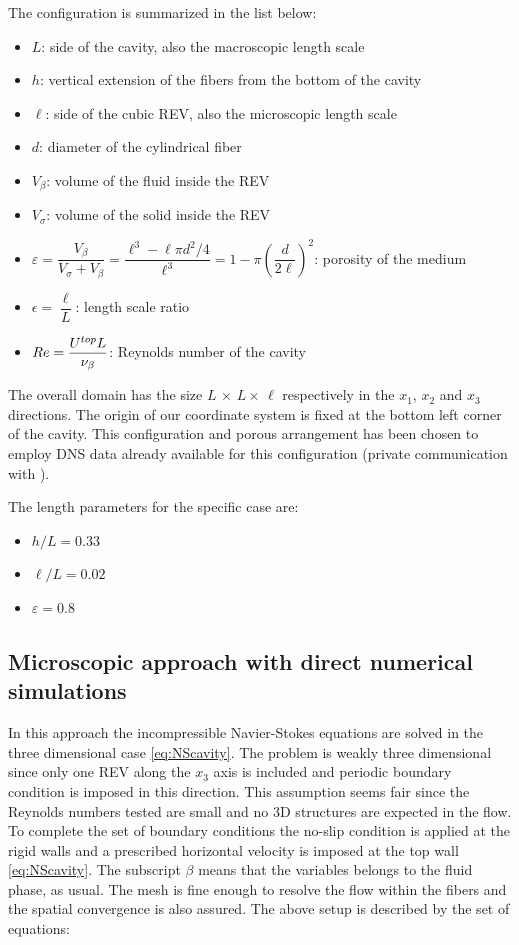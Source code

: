 The configuration is summarized in the list below:
\begin{itemize}
	\item $L$: side of the cavity, also the macroscopic length scale
	\item $h$: vertical extension of the fibers from the bottom of the cavity 
	\item $\ell$: side of the cubic REV, also the microscopic length scale
	\item $d$: diameter of the cylindrical fiber
	\item $V_{\beta}$: volume of the fluid inside the REV
	\item $V_{\sigma}$: volume of the solid inside the REV
	\item $\varepsilon = \dfrac{V_{\beta}}{V_{\sigma} +V_{\beta}} = \dfrac{\ell^3 -\ell \pi d^2 / 4}{\ell^3} = 1 - \pi \left(\dfrac{d}{2 \ell}\right)^2$: porosity of the medium
	\item $\epsilon = \dfrac{\ell}{L}$: length scale ratio
	\item $Re= \dfrac{U^{top} L}{\nu_{\beta}}$: Reynolds number of the cavity
\end{itemize}

The overall domain has the size $L \, \times \, L \times \, \ell$ respectively in the $x_1$, $x_2$ and $x_3$ directions. The origin of our coordinate system is fixed at the bottom left corner of the cavity. 
This configuration and porous arrangement has been chosen to employ DNS data already available for this configuration (private communication with \citet{zampogna2016fluid}).

The length parameters for the specific case are:
\begin{itemize}
	\item $h/L=0.33$
	\item $\ell/L=0.02$
	\item $\varepsilon = 0.8$
\end{itemize}

\subsection{Microscopic approach with direct numerical simulations}

In this approach the incompressible Navier-Stokes equations are solved in the three dimensional case \eqref{eq:NScavity}. 
The problem is weakly three dimensional since only one REV along the $x_3$ axis is included and periodic boundary condition is imposed in this direction.
This assumption seems fair since the Reynolds numbers tested are small and no 3D structures are expected in the flow.
To complete the set of boundary conditions the no-slip condition is applied at the rigid walls and a prescribed horizontal velocity is imposed at the top wall \eqref{eq:NScavity}. The subscript $\beta$ means that the variables belongs to the fluid phase, as usual. The mesh is fine enough to resolve the flow within the fibers and the spatial convergence is also assured. The above setup is described by the set of equations:

